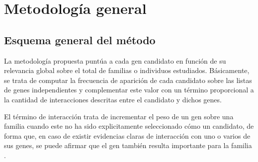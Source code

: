 
\section{Metodología general}

\subsection{Esquema general del método}

La metodología propuesta puntúa a cada gen candidato en función de su relevancia global sobre el total de familias o individuos estudiados. Básicamente, se trata de computar la frecuencia de aparición de cada candidato sobre las listas de genes independientes y complementar este valor con un término proporcional a la cantidad de interacciones descritas entre el candidato y dichos genes. 

\medskip
El término de interacción trata de incrementar el peso de un gen sobre una familia cuando este no ha sido explicitamente seleccionado cómo un candidato, de forma que, en caso de existir evidencias claras de interacción con uno o varios de sus genes, se puede afirmar que el gen también resulta importante para la familia .


